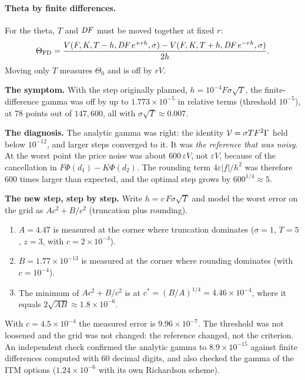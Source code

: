 \paragraph{Theta by finite differences.} For the theta, $T$ and $\mathit{DF}$ must be moved together at fixed $r$:
\begin{equation}\label{eq:theta-fd}
\Theta_{\text{FD}}=\frac{V(F,K,T-h,\mathit{DF}\,e^{+rh},\sigma)-V(F,K,T+h,\mathit{DF}\,e^{-rh},\sigma)}{2h}.
\end{equation}
Moving only $T$ measures $\Theta_0$ and is off by $rV$.

\begin{progetto}[title={In the qpricer project: the gamma that ``would not pass''}]
\textbf{The symptom.} With the step originally planned, $h=10^{-4}F\sigma\sqrt T$, the finite-difference gamma was off
by up to ${1.773\times10^{-5}}$ in relative terms (threshold $10^{-5}$), at 78 points out of $147{,}600$, all with
$\sigma\sqrt T\approx0.007$.

\textbf{The diagnosis.} The analytic gamma was right: the identity $\mathcal{V}=\sigma TF^2\Gamma$ held below $10^{-12}$,
and larger steps converged to it. It was \emph{the reference that was noisy}. At the worst point the price noise was
about $600\,\varepsilon V$, not $\varepsilon V$, because of the cancellation in $F\Phi(d_1)-K\Phi(d_2)$. The rounding
term $4\varepsilon|f|/h^2$ was therefore 600 times larger than expected, and the optimal step grows by
$600^{1/4}\approx5$.

\textbf{The new step, step by step.} Write $h=c\,F\sigma\sqrt T$ and model the worst error on the grid as
$A c^2+B/c^2$ (truncation plus rounding).
\begin{enumerate}
\item $A=4.47$ is measured at the corner where truncation dominates ($\sigma=1$, $T=5$, $z=3$, with
$c={2\times10^{-3}}$).
\item $B={1.77\times10^{-13}}$ is measured at the corner where rounding dominates (with $c=10^{-4}$).
\item The minimum of $Ac^2+B/c^2$ is at $c^*=(B/A)^{1/4}={4.46\times10^{-4}}$, where it equals
$2\sqrt{AB}\approx{1.8\times10^{-6}}$.
\end{enumerate}
With $c={4.5\times10^{-4}}$ the measured error is ${9.96\times10^{-7}}$. The threshold was not loosened and the grid
was not changed: the reference changed, not the criterion. An independent check confirmed the analytic gamma to
${8.9\times10^{-15}}$ against finite differences computed with 60 decimal digits, and also checked the gamma of the
ITM options (${1.24\times10^{-6}}$ with its own Richardson scheme).
\end{progetto}


